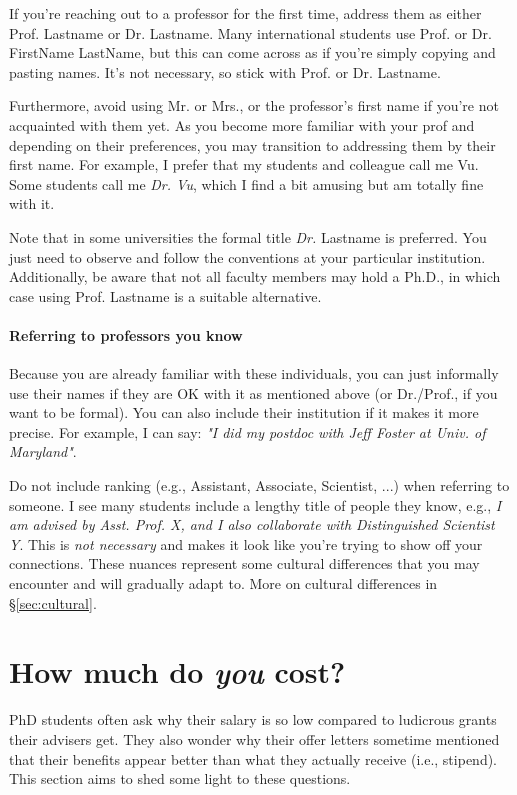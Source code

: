 \documentclass[oneside,11pt]{memoir}
\begin{document}
If you're reaching out to a professor for the first time,  address them as either Prof. Lastname or Dr. Lastname. Many international students use Prof. or Dr. FirstName LastName, but this can come across as if you're simply copying and pasting names. It's not necessary, so stick with Prof. or Dr. Lastname.


Furthermore, avoid using Mr. or Mrs., or the professor's first name if you're not acquainted with them yet.  As you become more familiar with your prof and depending on their preferences, you may transition to addressing them by their first name.
For example, I prefer that my students and colleague call me Vu. Some students call me \emph{Dr. Vu}, which I find a bit amusing but am totally fine with it. 


Note that in some universities the formal title \emph{Dr.} Lastname is preferred. You just need to observe and follow the conventions at your particular institution. Additionally, be aware that not all faculty members may hold a Ph.D., in which case using Prof. Lastname is a suitable alternative.


\paragraph{Referring to professors you know} Because you are already familiar with these individuals, you can just informally use their names if they are OK with it as mentioned above (or Dr./Prof., if you want to be formal). You can also include their institution if it makes it more precise.  For example, I can say:  \emph{"I did my postdoc with Jeff Foster at Univ. of Maryland"}.   

Do not include ranking (e.g., Assistant, Associate, Scientist, ...) when referring to someone. I see many students include a lengthy title of people they know, e.g., \emph{I am advised by Asst. Prof. X, and I also collaborate with Distinguished Scientist Y}.  This is \emph{not necessary} and makes it look like you're trying to show off your connections. These nuances represent some cultural differences that you may encounter and will gradually adapt to. More on cultural differences in \S\ref{sec:cultural}.

\section{How much do \emph{you} cost?}\label{sec:ra-cost}
PhD students often ask why their salary is so low compared to ludicrous grants their advisers get. They also wonder why their offer letters sometime mentioned that their benefits appear better than what they actually receive (i.e., stipend).  This section aims to shed some light to these questions.
\end{document}
